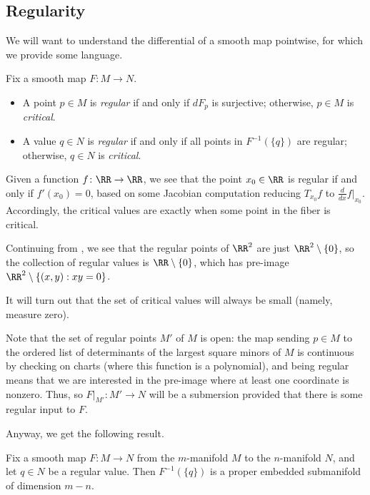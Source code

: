 \documentclass[../notes.tex]{subfiles}
\begin{document}
\subsection{Regularity}
We will want to understand the differential of a smooth map pointwise, for which we provide some language.
\begin{defihelper}  
	Fix a smooth map $F\colon M\to N$.
	\begin{itemize}
		\item A point $p\in M$ is \textit{regular} if and only if $dF_p$ is surjective; otherwise, $p\in M$ is \textit{critical}.
		\item A value $q\in N$ is \textit{regular} if and only if all points in $F^{-1}(\{q\})$ are regular; otherwise, $q\in N$ is \textit{critical}.
	\end{itemize}
\end{defihelper}
\begin{example}
	Given a function $f\colon\RR\to\RR$, we see that the point $x_0\in\RR$ is regular if and only if $f'(x_0)=0$, based on some Jacobian computation reducing $T_{x_0}f$ to $\frac d{dx}f\big|_{x_0}$. Accordingly, the critical values are exactly when some point in the fiber is critical.
\end{example}
\begin{example}
	Continuing from , we see that the regular points of $\RR^2$ are just $\RR^2\setminus\{0\}$, so the collection of regular values is $\RR\setminus\{0\}$, which has pre-image $\RR^2\setminus\{(x,y):xy=0\}$.
\end{example}
It will turn out that the set of critical values will always be small (namely, measure zero).
\begin{remark} \label{rem:reg-locus-is-open}
	Note that the set of regular points $M'$ of $M$ is open: the map sending $p\in M$ to the ordered list of determinants of the largest square minors of $M$ is continuous by checking on charts (where this function is a polynomial), and being regular means that we are interested in the pre-image where at least one coordinate is nonzero. Thus, so $F|_{M'}\colon M'\to N$ will be a submersion provided that there is some regular input to $F$.
\end{remark}
Anyway, we get the following result.
\begin{proposition} \label{prop:level-set-regular}
	Fix a smooth map $F\colon M\to N$ from the $m$-manifold $M$ to the $n$-manifold $N$, and let $q\in N$ be a regular value. Then $F^{-1}(\{q\})$ is a proper embedded submanifold of dimension $m-n$.
\end{proposition}
\end{document}
